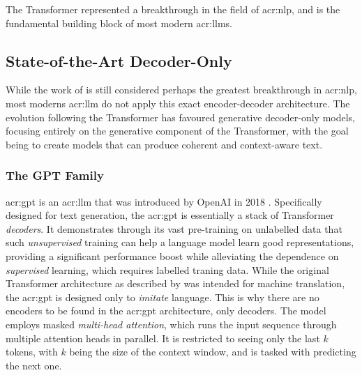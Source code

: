 The Transformer represented a breakthrough in the field of \gls{acr:nlp}, and is the fundamental building block of most modern \glspl{acr:llm}.


\subsection[State-of-the-Art Decoder-Only LLMs]{State-of-the-Art Decoder-Only }
\label{subsec:sota-decoder-only-llms}

While the work of \cite{vaswaniAttentionAllYou2017} is still considered perhaps the greatest breakthrough in \gls{acr:nlp}, most moderns \acrshort{acr:llm} do not apply this exact encoder-decoder architecture. The evolution following the Transformer has favoured generative decoder-only models, focusing entirely on the generative component of the Transformer, with the goal being to create models that can produce coherent and context-aware text.

\subsubsection{The GPT Family}
\label{subusubsec:gpt}

\gls{acr:gpt} is an \acrshort{acr:llm} that was introduced by OpenAI in 2018 \citep{radfordImprovingLanguageUnderstanding2018}. Specifically designed for text generation, the \acrshort{acr:gpt} is essentially a stack of Transformer \textit{decoders}. It demonstrates through its vast pre-training on unlabelled data that such \textit{unsupervised} training can help a language model learn good representations, providing a significant performance boost while alleviating the dependence on \textit{supervised} learning, which requires labelled traning data. While the original Transformer architecture as described by \cite{vaswaniAttentionAllYou2017} was intended for machine translation, the \acrshort{acr:gpt} is designed only to \textit{imitate} language. This is why there are no encoders to be found in the \acrshort{acr:gpt} architecture, only decoders. The model employs masked \textit{multi-head attention}, which runs the input sequence through multiple attention heads in parallel. It is restricted to seeing only the last $k$ tokens, with $k$ being the size of the context window, and is tasked with predicting the next one.

